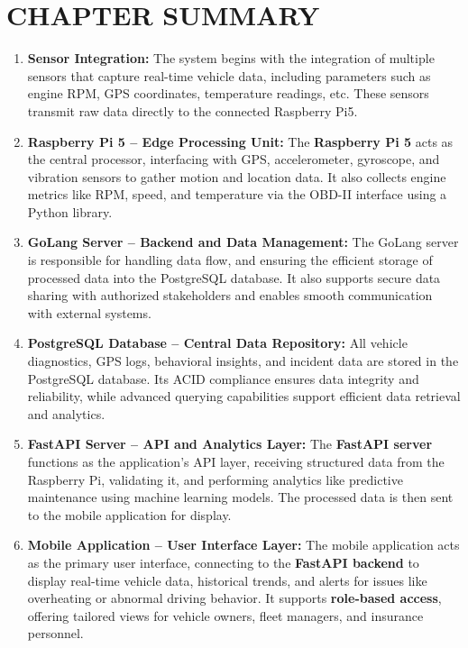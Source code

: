 \section{CHAPTER SUMMARY}
    \begin{enumerate}
        \item \textbf{Sensor Integration:}  The system begins with the integration of multiple sensors that capture real-time vehicle data, including parameters such as engine RPM, GPS coordinates, temperature readings, etc. These sensors transmit raw data directly to the connected Raspberry Pi5.
        \item \textbf{Raspberry Pi 5 – Edge Processing Unit:}  The \textbf{Raspberry Pi 5} acts as the central processor, interfacing with GPS, accelerometer, gyroscope, and vibration sensors to gather motion and location data. It also collects engine metrics like RPM, speed, and temperature via the OBD-II interface using a Python library.
        \item \textbf{GoLang Server – Backend and Data Management:}  The GoLang server is responsible for handling data flow, and ensuring the efficient storage of processed data into the PostgreSQL database. It also supports secure data sharing with authorized stakeholders and enables smooth communication with external systems.
        \item \textbf{PostgreSQL Database – Central Data Repository:}  All vehicle diagnostics, GPS logs, behavioral insights, and incident data are stored in the PostgreSQL database. Its ACID compliance ensures data integrity and reliability, while advanced querying capabilities support efficient data retrieval and analytics.
        \item \textbf{FastAPI Server – API and Analytics Layer:}  The \textbf{FastAPI server} functions as the application’s API layer, receiving structured data from the Raspberry Pi, validating it, and performing analytics like predictive maintenance using machine learning models. The processed data is then sent to the mobile application for display.
        \item \textbf{Mobile Application – User Interface Layer:}  The mobile application acts as the primary user interface, connecting to the \textbf{FastAPI backend} to display real-time vehicle data, historical trends, and alerts for issues like overheating or abnormal driving behavior. It supports \textbf{role-based access}, offering tailored views for vehicle owners, fleet managers, and insurance personnel.
    \end{enumerate}